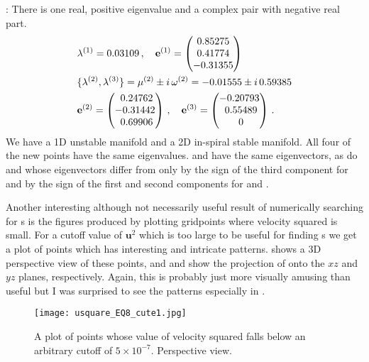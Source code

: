 : There is one real, positive eigenvalue
 and a complex pair with negative real part.
  \begin{align} &\eigExp[1] = 0.03109 \,,\quad \jEigvec[1] =
\begin{pmatrix}
             {0.85275} \cr
             {0.41774} \cr
             {-0.31355} \cr
   \end{pmatrix}
   \\
&\{ \eigExp[2],\eigExp[3]\}
  = \eigRe[2] \pm i \,\eigIm[2] =  -0.01555 \pm i\, 0.59385
   \label{EQSP5eigs}\\
&\jEigvec[2] =
\begin{pmatrix}
             {~0.24762} \cr
             {-0.31442} \cr
             {~0.69906} \cr
   \end{pmatrix}
    \,,\quad
\jEigvec[3] =
\begin{pmatrix}
             {-0.20793} \cr
             {~0.55489} \cr
             {~0} \cr
   \end{pmatrix}
\,.
\end{align}
 We have a 1D unstable manifold and a 2D in-spiral
stable manifold. All four of the new points have the same
eigenvalues.  and  have the same eigenvectors, as do 
and  whose eigenvectors differ from  only by the sign of
the third component for \jEigvec[1] and by the sign of the first and
second components for \jEigvec[2] and \jEigvec[3].

Another interesting although not necessarily useful result of
numerically searching for \stagp s is the figures produced by
plotting gridpoints where velocity squared is small. For a cutoff
value of $\mathbf{u}^{2}$ which is too large to be useful for
finding \stagp s we get a plot of points which has interesting and
intricate patterns.  shows a 3D
perspective view of these points, and
 and 
show the projection of  onto the $xz$
and $yz$ planes, respectively. Again, this is probably just more
visually amusing than useful but I was surprised to see the patterns
especially in . \\

\begin{figure}[!h]
\texttt{[image: usquare\_EQ8\_cute1.jpg]}
  \caption{
   A plot of points whose value of velocity squared falls below an
   arbitrary cutoff of $5\times 10^{-7}$. Perspective view.
   }
  \label{eltonFig:usquare_EQ8_1}
 \end{figure}

